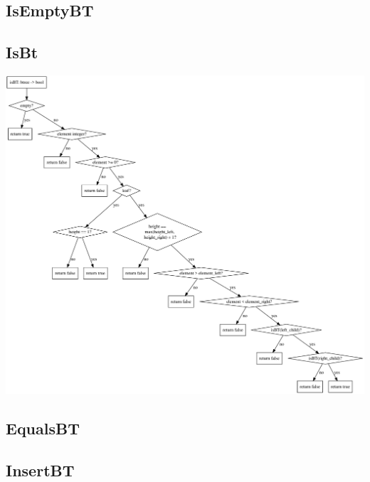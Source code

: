 \documentclass[11pt]{article}
\begin{document}
    \subsection{IsEmptyBT}

    \subsection{IsBt}

    \begin{center}
        \includegraphics[width=1.2\columnwidth] {isBt}
    \end{center}

    \subsection{EqualsBT}

    \subsection{InsertBT}
\end{document}

